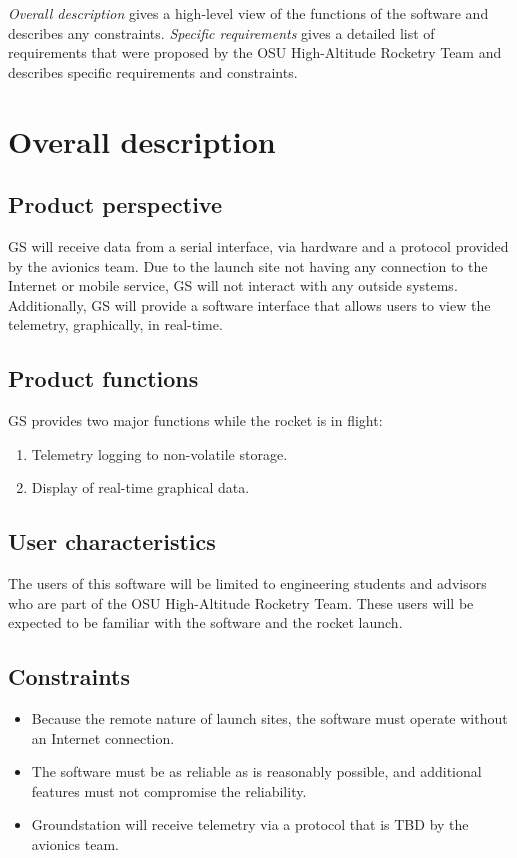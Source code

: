 \documentclass[10pt,journal,draftclsnofoot,onecolumn]{IEEEtran}
\begin{document}
	\textit{Overall description} gives a high-level view of the functions of the software and describes any constraints.
	\textit{Specific requirements} gives a detailed list of requirements that were proposed by the OSU High-Altitude
	Rocketry Team and describes specific requirements and constraints.
		
	
	\section{Overall description}
	\subsection{Product perspective}
	GS will receive data from a serial interface, via hardware and a protocol provided by the avionics team.
	Due to the launch site not having any connection to the Internet or mobile service, GS will not interact with
	any outside systems. 
	Additionally, GS will provide a software interface that allows users to view the telemetry,
	graphically, in real-time.
	\subsection{Product functions}
	GS provides two major functions while the rocket is in flight:
	
	\begin{enumerate}
		\item Telemetry logging to non-volatile storage.
		\item Display of real-time graphical data. 
	\end{enumerate}
	
	\subsection{User characteristics}
	The users of this software will be limited to engineering students and advisors who are part of the OSU High-Altitude
	Rocketry Team.
	These users will be expected to be familiar with the software and the rocket launch.
	
	\subsection{Constraints}
	\begin{itemize}
		\item Because the remote nature of launch sites, the software must operate without an Internet connection.
		\item The software must be as reliable as is reasonably possible, and additional features must not compromise the reliability.
		\item Groundstation will receive telemetry via a protocol that is TBD by the avionics team.
	\end{itemize}
\end{document}
